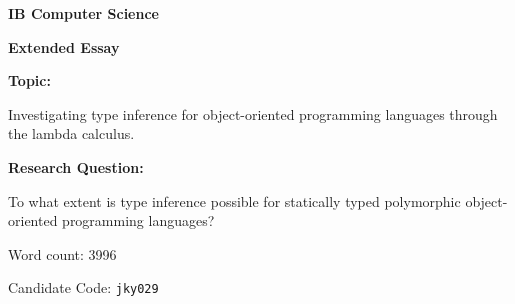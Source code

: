 \documentclass[12pt,a4paper]{article}
\begin{document}

\begin{titlepage}
\begin{center}

\Large
\textbf{IB Computer Science}

\large
\textbf{Extended Essay}

\vspace*{4cm}

\large
\textbf{Topic:}

\normalsize
Investigating type inference for object-oriented programming languages
through the lambda calculus.

\vspace{1cm}

\large
\textbf{Research Question:}

\normalsize
To what extent is type inference possible for statically typed polymorphic
object-oriented programming languages?

\vspace{4cm}

Word count: 3996

\vfill
\vspace{0.1cm}

Candidate Code: \texttt{jky029}

\end{center}
\end{titlepage}



\begin{center}
\tableofcontents
\end{center}

\newpage


\onehalfspacing
{}












\end{document}
